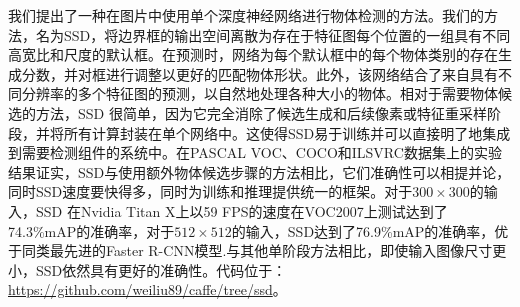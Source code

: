 \documentclass[../main.tex]{subfile}
\begin{document}
我们提出了一种在图片中使用单个深度神经网络进行物体检测的方法。我们的方法，名为SSD，将边界框的输出空间离散为存在于特征图每个位置的一组具有不同高宽比和尺度的默认框。在预测时，网络为每个默认框中的每个物体类别的存在生成分数，并对框进行调整以更好的匹配物体形状。此外，该网络结合了来自具有不同分辨率的多个特征图的预测，以自然地处理各种大小的物体。相对于需要物体候选的方法，SSD 很简单，因为它完全消除了候选生成和后续像素或特征重采样阶段，并将所有计算封装在单个网络中。这使得SSD易于训练并可以直接明了地集成到需要检测组件的系统中。在PASCAL VOC、COCO和ILSVRC数据集上的实验结果证实，SSD与使用额外物体候选步骤的方法相比，它们准确性可以相提并论，同时SSD速度要快得多，同时为训练和推理提供统一的框架。对于$300 \times 300$的输入，SSD 在Nvidia Titan X上以59 FPS的速度在VOC2007上测试达到了74.3\%mAP的准确率，对于$512 \times 512$的输入，SSD达到了76.9\%mAP的准确率，优于同类最先进的Faster R-CNN模型.与其他单阶段方法相比，即使输入图像尺寸更小，SSD依然具有更好的准确性。代码位于：\href{https://github.com/weiliu89/caffe/tree/ssd}{https://github.com/weiliu89/caffe/tree/ssd}。
\end{document}
